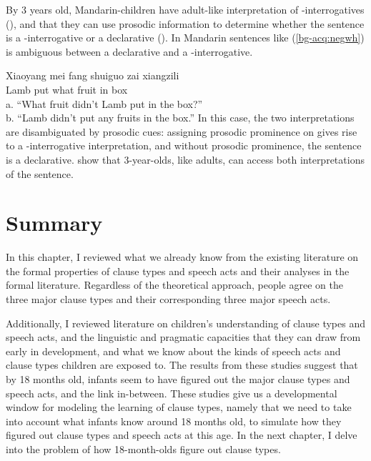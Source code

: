 By 3 years old, Mandarin-children have adult-like interpretation of \twh-interrogatives (\citealt{fahn2003acq}), and that they can use prosodic information to determine whether the sentence is a \twh-interrogative or a declarative (\cite{WHanything}). In Mandarin sentences like  (\ref{bg-acq:negwh}) is ambiguous between a declarative and a \twh-interrogative. 

\gll Xiaoyang mei	fang	 shuiguo zai	xiangzili\\
Lamb \Neg{}	put	what		fruit		in	box\\
\trans a. ``What fruit didn't Lamb put in the box?''\\
b.	``Lamb didn't put any fruits in the box.''
\eex
In this case, the two interpretations are disambiguated by prosodic cues: assigning prosodic prominence on  gives rise to a \twh-interrogative interpretation, and without prosodic prominence, the sentence is a declarative. \textcite{WHanything} show that 3-year-olds, like adults, can access both interpretations of the sentence.

\section{Summary}

In this chapter, I reviewed what we already know from the existing literature on the formal properties of clause types and speech acts and their analyses in the formal literature. Regardless of the theoretical approach, people agree on the three major clause types and their corresponding three major speech acts. 


Additionally, I reviewed literature on children's understanding of clause types and speech acts, and the linguistic and pragmatic capacities that they can draw from early in development, and what we know about the kinds of speech acts and clause types children are exposed to. The results from these studies suggest that by 18 months old, infants seem to have figured out the major clause types and speech acts, and the link in-between. These studies give us a developmental window for modeling the learning of clause types, namely that we need to take into account what infants know around 18 months old, to simulate how they figured out clause types and speech acts at this age. In the next chapter, I delve into the problem of how 18-month-olds figure out clause types. 





